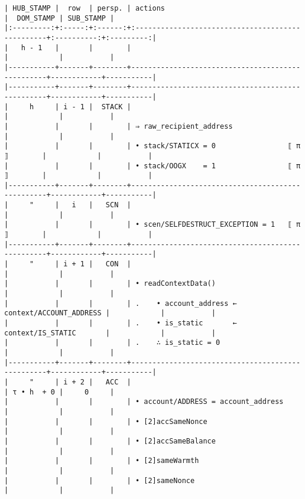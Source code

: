 \documentclass[varwidth=\maxdimen,margin=0.5cm,multi={verbatim}]{standalone}
\begin{document}
\begin{verbatim}
| HUB_STAMP |  row  | persp. | actions                                          |  DOM_STAMP | SUB_STAMP |
|:---------:+:-----:+:------:+:-------------------------------------------------+:----------:+:---------:|
|   h - 1   |       |        |                                                  |            |           |
|-----------+-------+--------+--------------------------------------------------+------------+-----------|
|-----------+-------+--------+--------------------------------------------------+------------+-----------|
|     h     | i - 1 |  STACK |                                                  |            |           |
|           |       |        | ⇒ raw_recipient_address                          |            |           |
|           |       |        | • stack/STATICX = 0                 ⟦ π ⟧        |            |           |
|           |       |        | • stack/OOGX    = 1                 ⟦ π ⟧        |            |           |
|-----------+-------+--------+--------------------------------------------------+------------+-----------|
|     "     |   i   |   SCN  |                                                  |            |           |
|           |       |        | • scen/SELFDESTRUCT_EXCEPTION = 1   ⟦ π ⟧        |            |           |
|-----------+-------+--------+--------------------------------------------------+------------+-----------|
|     "     | i + 1 |   CON  |                                                  |            |           |
|           |       |        | • readContextData()                              |            |           |
|           |       |        | .    • account_address ← context/ACCOUNT_ADDRESS |            |           |
|           |       |        | .    • is_static       ← context/IS_STATIC       |            |           |
|           |       |        | .    ∴ is_static = 0                             |            |           |
|-----------+-------+--------+--------------------------------------------------+------------+-----------|
|     "     | i + 2 |   ACC  |                                                  | τ • h  + 0 |     0     |
|           |       |        | • account/ADDRESS = account_address              |            |           |
|           |       |        | • [2]accSameNonce                                |            |           |
|           |       |        | • [2]accSameBalance                              |            |           |
|           |       |        | • [2]sameWarmth                                  |            |           |
|           |       |        | • [2]sameNonce                                   |            |           |

\end{verbatim}
\end{document}
